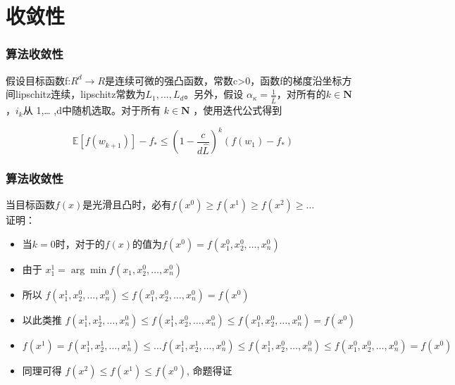 \documentclass[10pt]{beamer}
\begin{document}
\section{收敛性}

\begin{frame}
	
	\frametitle{算法收敛性}
	\begin{mytheorem}[定理]
	假设目标函数f:$R^{d} →R$是连续可微的强凸函数，常数c>0，函数f的梯度沿坐标方间lipschitz连续，lipschitz常数为$L_{1},...,L_{d}$。另外，假设
	$\alpha_{\kappa}=\frac{1}{\hat{L}}$，对所有的$k\in\mathbf{N}$，$i_{k}$从	{1,… ,d}中随机选取。对于所有 $k\in\mathbf{N}$ ，使用迭代公式得到
	
	$$
	\mathbb{E}[f(w_{\dot{k}+1})]-f_{*}\leqslant\left(1-\frac{c}{d\hat{L}}\right)^{k}(f(w_{1})-f_{*})
	$$
	
	\end{mytheorem}
	
	
	
	
\end{frame}

\begin{frame}
	\frametitle{算法收敛性}
当目标函数$f(x)$是光滑且凸时，必有$f\left(x^{0}\right)\geq f\left(x^{1}\right) \geq f\left(x^{2}\right) \geq \ldots$  \\

\bigskip
证明： \\
\bigskip
\begin{itemize}
\item[ ] 当$k=0$时，对于的$f(x)$的值为$f\left(x^{0}\right)=f\left(x_{1}^{0}, x_{2}^{0}, \ldots, x_{n}^{0}\right)$ \\
\item[ ]
由于 $x_{1}^{1}=\arg \min f\left(x_{1}, x_{2}^{0}, \ldots, x_{n}^{0}\right)$
\item[ ] 所以 $f\left(x_{1}^{1}, x_{2}^{0}, \ldots, x_{n}^{0}\right) \leq f\left(x_{1}^{0}, x_{2}^{0}, \ldots, x_{n}^{0}\right)=f\left(x^{0}\right)$
\item[ ] 以此类推
 $f\left(x_{1}^{1}, x_{2}^{1}, \ldots, x_{n}^{0}\right) \leq f\left(x_{1}^{1}, x_{2}^{0}, \ldots, x_{n}^{0}\right) \leq f\left(x_{1}^{0}, x_{2}^{0}, \ldots, x_{n}^{0}\right)=f\left(x^{0}\right)$
\item[ ]  $f\left(x^{1}\right)=f\left(x_{1}^{1}, x_{2}^{1}, \ldots, x_{n}^{1}\right) \leq \ldots f\left(x_{1}^{1}, x_{2}^{1}, \ldots, x_{n}^{0}\right) \leq f\left(x_{1}^{1}, x_{2}^{0}, \ldots, x_{n}^{0}\right) \leq f\left(x_{1}^{0}, x_{2}^{0}, \ldots, x_{n}^{0}\right)=f\left(x^{0}\right)$
\item[ ] 同理可得 $f\left(x^{2}\right) \leq f\left(x^{1}\right) \leq f\left(x^{0}\right)$, 命题得证
\end{itemize}
\end{frame}
\end{document}
